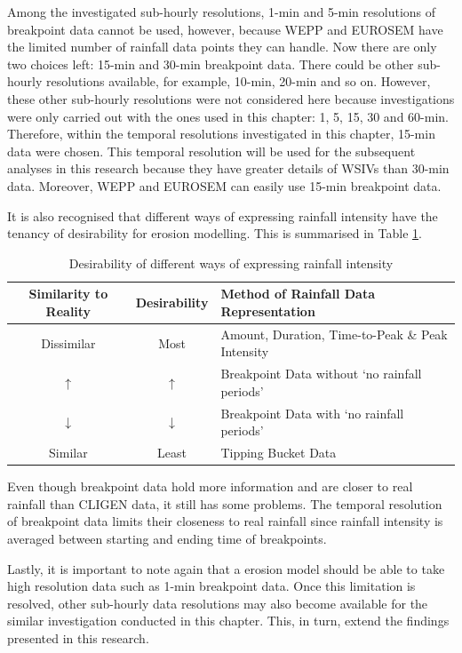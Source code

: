 Among the investigated sub-hourly resolutions, 1-min and 5-min resolutions of
breakpoint data cannot be used, however, because WEPP and EUROSEM have the
limited number of rainfall data points they can handle. Now there are only two
choices left: 15-min and 30-min breakpoint data.
There could be other sub-hourly resolutions available, for example, 10-min,
20-min and so on. However, these other sub-hourly resolutions were not
considered here because investigations were only carried out with the ones used
in this chapter: 1, 5, 15, 30 and 60-min. Therefore, within the temporal
resolutions investigated in this chapter, 15-min data were chosen. This temporal
resolution will be used for the subsequent analyses in this research because
they have greater details of WSIVs than 30-min data. Moreover, WEPP and EUROSEM
can easily use 15-min breakpoint data.

It is also recognised that different ways of expressing rainfall intensity have
the tenancy of desirability for erosion modelling. This is summarised in Table
\ref{tab:DesirabilityOfDifferentWaysOfExpressingRainfallIntensity}.

\begin{table}[htbp]
  \small
  \centering
      \caption{Desirability of different ways of expressing rainfall intensity}
  \label{tab:DesirabilityOfDifferentWaysOfExpressingRainfallIntensity}
    \begin{tabular}{ccl}
    \toprule
    Similarity to Reality & Desirability & Method of Rainfall Data
Representation\\
    \midrule
    Dissimilar & Most & Amount, Duration, Time-to-Peak \& Peak Intensity\\
    $\uparrow$ & $\uparrow$ &  Breakpoint Data without `no rainfall periods'\\
    $\downarrow$ & $\downarrow$ &  Breakpoint Data with `no rainfall periods'\\
    Similar & Least & Tipping Bucket Data\\
    \bottomrule
    \end{tabular}
\end{table}

Even though breakpoint data hold more information and are closer to real
rainfall than CLIGEN data, it still has some problems. The temporal resolution
of breakpoint data limits their closeness to real rainfall since rainfall
intensity is averaged between starting and ending time of breakpoints.

Lastly, it is important to note again that a erosion model should be able
to take high resolution data such as 1-min breakpoint data. Once this
limitation is resolved, other sub-hourly data resolutions may also become
available for the similar investigation conducted in this chapter. This, in
turn, extend the findings presented in this research.

